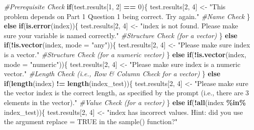 \documentclass[
  12pt,
]{book}
\newenvironment{Shaded}{\begin{snugshade}}{\end{snugshade}}
\newcommand{\AttributeTok}[1]{\textcolor[rgb]{0.13,0.29,0.53}{#1}}
\newcommand{\CommentTok}[1]{\textcolor[rgb]{0.56,0.35,0.01}{\textit{#1}}}
\newcommand{\ControlFlowTok}[1]{\textcolor[rgb]{0.13,0.29,0.53}{\textbf{#1}}}
\newcommand{\DecValTok}[1]{\textcolor[rgb]{0.00,0.00,0.81}{#1}}
\newcommand{\FunctionTok}[1]{\textcolor[rgb]{0.13,0.29,0.53}{\textbf{#1}}}
\newcommand{\NormalTok}[1]{#1}
\newcommand{\OtherTok}[1]{\textcolor[rgb]{0.56,0.35,0.01}{#1}}
\newcommand{\SpecialCharTok}[1]{\textcolor[rgb]{0.81,0.36,0.00}{\textbf{#1}}}
\newcommand{\StringTok}[1]{\textcolor[rgb]{0.31,0.60,0.02}{#1}}
\begin{document}
\begin{Shaded}
\begin{Highlighting}[]
\CommentTok{\#Prerequisite Check }
\ControlFlowTok{if}\NormalTok{(test.results[}\DecValTok{1}\NormalTok{, }\DecValTok{2}\NormalTok{] }\SpecialCharTok{==} \DecValTok{0}\NormalTok{)\{}
\NormalTok{  test.results[}\DecValTok{2}\NormalTok{, }\DecValTok{4}\NormalTok{] }\OtherTok{\textless{}{-}} \StringTok{"This problem depends on Part 1 Question 1 being correct. Try again."}
\CommentTok{\#Name Check }
\NormalTok{\} }\ControlFlowTok{else} \ControlFlowTok{if}\NormalTok{(}\FunctionTok{is.error}\NormalTok{(index))\{ }
\NormalTok{  test.results[}\DecValTok{2}\NormalTok{, }\DecValTok{4}\NormalTok{] }\OtherTok{\textless{}{-}} \StringTok{"\textasciigrave{}index\textasciigrave{} is not found. Please make sure your variable is named correctly."}
\CommentTok{\#Structure Check (for a vector)}
\NormalTok{\} }\ControlFlowTok{else} \ControlFlowTok{if}\NormalTok{(}\SpecialCharTok{!}\FunctionTok{is.vector}\NormalTok{(index, }\AttributeTok{mode =} \StringTok{"any"}\NormalTok{))\{ }
\NormalTok{  test.results[}\DecValTok{2}\NormalTok{, }\DecValTok{4}\NormalTok{] }\OtherTok{\textless{}{-}} \StringTok{"Please make sure \textasciigrave{}index\textasciigrave{} is a vector."}
\CommentTok{\#Structure Check (for a numeric vector)}
\NormalTok{\} }\ControlFlowTok{else} \ControlFlowTok{if}\NormalTok{(}\SpecialCharTok{!}\FunctionTok{is.vector}\NormalTok{(index, }\AttributeTok{mode =} \StringTok{"numeric"}\NormalTok{))\{ }
\NormalTok{  test.results[}\DecValTok{2}\NormalTok{, }\DecValTok{4}\NormalTok{] }\OtherTok{\textless{}{-}} \StringTok{"Please make sure \textasciigrave{}index\textasciigrave{} is a numeric vector."}
\CommentTok{\#Length Check (i.e., Row \& Column Check for a vector)}
\NormalTok{\} }\ControlFlowTok{else} \ControlFlowTok{if}\NormalTok{(}\FunctionTok{length}\NormalTok{(index) }\SpecialCharTok{!=} \FunctionTok{length}\NormalTok{(index\_test))\{ }
\NormalTok{  test.results[}\DecValTok{2}\NormalTok{, }\DecValTok{4}\NormalTok{] }\OtherTok{\textless{}{-}} \StringTok{"Please make sure the vector \textasciigrave{}index\textasciigrave{} is the correct length, as specified by the prompt (i.e., there are 3 elements in the vector)."}
\CommentTok{\#Value Check (for a vector)}
\NormalTok{\} }\ControlFlowTok{else} \ControlFlowTok{if}\NormalTok{(}\SpecialCharTok{!}\FunctionTok{all}\NormalTok{(index }\SpecialCharTok{\%in\%}\NormalTok{ index\_test))\{ }
\NormalTok{  test.results[}\DecValTok{2}\NormalTok{, }\DecValTok{4}\NormalTok{] }\OtherTok{\textless{}{-}} \StringTok{"\textasciigrave{}index\textasciigrave{} has incorrect values. Hint: did you use the argument replace = TRUE in the \textasciigrave{}sample()\textasciigrave{} function?"}

\end{Highlighting}
\end{Shaded}
\end{document}
